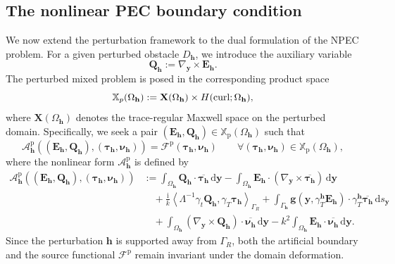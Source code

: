 \documentclass[10pt,a4paper]{amsart}
\numberwithin{equation}{section}
\begin{document}
\subsection{The nonlinear PEC boundary condition}

We now extend the perturbation framework to the dual formulation of the
NPEC problem. For a given perturbed obstacle \(D_{\mathbf h}\), we introduce
the auxiliary variable
\[
\mathbf Q_{\mathbf h}:=\nabla_{\boldsymbol y}\times\mathbf E_{\mathbf h}.
\]
The perturbed mixed problem is posed in the corresponding product space
\[
\mathbb X_{\rm p}(\Omega_{\mathbf h})
:=
\mathbf X(\Omega_{\mathbf h})
\times
H(\operatorname{curl};\Omega_{\mathbf h}),
\]
where \(\mathbf X(\Omega_{\mathbf h})\) denotes the trace-regular Maxwell
space on the perturbed domain.
Specifically, we seek a pair $(\mathbf{E}_{\mathbf{h}}, \mathbf{Q}_{\mathbf{h}}) \in \mathbb{X}_{\mathrm{p}}(\Omega_{\mathbf{h}})$ such that 
\begin{equation}
\label{eq:perturbed_NPEC_mixed}
\mathcal{A}_{\mathbf{h}}^{\mathrm{p}} \left( (\mathbf{E}_{\mathbf{h}}, \mathbf{Q}_{\mathbf{h}}), (\boldsymbol{\tau}_{\mathbf{h}}, \boldsymbol{\nu}_{\mathbf{h}}) \right) = \mathcal{F}^{\mathrm{p}}(\boldsymbol{\tau}_{\mathbf{h}}, \boldsymbol{\nu}_{\mathbf{h}}) \qquad \forall (\boldsymbol{\tau}_{\mathbf{h}}, \boldsymbol{\nu}_{\mathbf{h}}) \in \mathbb{X}_{\mathrm{p}}(\Omega_{\mathbf{h}}),
\end{equation}
where the nonlinear form $\mathcal{A}_{\mathbf{h}}^{\mathrm{p}}$ is defined by
\begin{equation}
\label{eq:NPEC_form_definition}
\begin{aligned}
\mathcal{A}_{\mathbf{h}}^{\mathrm{p}} \left( (\mathbf{E}_{\mathbf{h}}, \mathbf{Q}_{\mathbf{h}}), (\boldsymbol{\tau}_{\mathbf{h}}, \boldsymbol{\nu}_{\mathbf{h}}) \right) &:= \int_{\Omega_{\mathbf{h}}} \mathbf{Q}_{\mathbf{h}} \cdot \overline{\boldsymbol{\tau}_{\mathbf{h}}} \,\mathrm{d}\boldsymbol{y} - \int_{\Omega_{\mathbf{h}}} \mathbf{E}_{\mathbf{h}} \cdot (\nabla_{\boldsymbol{y}} \times \overline{\boldsymbol{\tau}_{\mathbf{h}}}) \,\mathrm{d}\boldsymbol{y} \\
&\quad + \frac{\mathrm{i}}{k} \left\langle \Lambda^{-1} \gamma_t \mathbf{Q}_{\mathbf{h}}, \gamma_T \boldsymbol{\tau}_{\mathbf{h}} \right\rangle_{\Gamma_R} + \int_{\Gamma_{\mathbf{h}}} \mathbf{g}(\boldsymbol{y}, \gamma_T^{\mathbf{h}} \mathbf{E}_{\mathbf{h}}) \cdot \gamma_T^{\mathbf{h}} \overline{\boldsymbol{\tau}_{\mathbf{h}}} \,\mathrm{d}s_{\boldsymbol{y}} \\
&\quad + \int_{\Omega_{\mathbf{h}}} (\nabla_{\boldsymbol{y}} \times \mathbf{Q}_{\mathbf{h}}) \cdot \overline{\boldsymbol{\nu}_{\mathbf{h}}} \,\mathrm{d}\boldsymbol{y} - k^2 \int_{\Omega_{\mathbf{h}}} \mathbf{E}_{\mathbf{h}} \cdot \overline{\boldsymbol{\nu}_{\mathbf{h}}} \,\mathrm{d}\boldsymbol{y}.
\end{aligned}
\end{equation}
Since the perturbation $\mathbf{h}$ is supported away from $\Gamma_R$, both the artificial boundary and the source functional $\mathcal{F}^{\mathrm{p}}$ remain invariant under the domain deformation.
\end{document}
